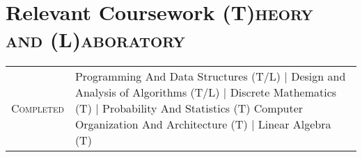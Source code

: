 \documentclass[a4paper,10pt]{extarticle} %
\begin{document}




\vspace{-0.2cm}
\section{\textcolor{primary}{Relevant Coursework}
\hfill\small\textsc{(T)heory and (L)aboratory}}

\begin{tabular}{r|p{15cm}}
\textsc{Completed} & Programming And Data Structures (T/L) | Design and Analysis of Algorithms (T/L) | Discrete Mathematics (T) | Probability And Statistics (T) Computer Organization And Architecture (T) | Linear Algebra (T)
\end{tabular}

\end{document}
